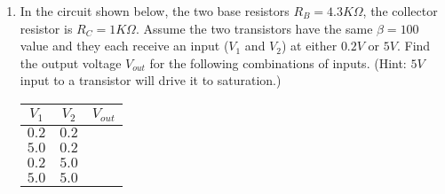 \begin{enumerate}


\item In the circuit shown below, the two base resistors $R_B=4.3K\Omega$,
the collector resistor is $R_C=1K\Omega$. Assume the two transistors
have the same $\beta=100$ value and they each receive an input ($V_1$ and
$V_2$) at either $0.2V$ or $5V$. Find the output voltage $V_{out}$ for
the following combinations of inputs. (Hint: $5V$ input to a transistor
will drive it to saturation.)

\begin{tabular}{cc|c}\hline
$V_1$ & $V_2$ & $V_{out}$ \\ \hline
  $0.2$ & $0.2$ &         \\
  $5.0$ & $0.2$ &         \\
  $0.2$ & $5.0$ &         \\
  $5.0$ & $5.0$ &         \hline
\end{tabular}




\end{enumerate}




